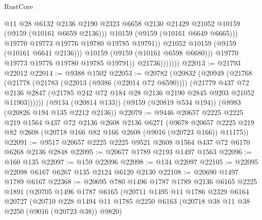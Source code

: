 \begin{lexlean}{RustCore}
\begin{coremodule}
                                  @11
                                  @28
                                  @6132
                                  @2136
                                  @2190
                                  @2323
                                  @6658
                                  @2130
                                  @21429
                                  @21052
                                  @10159
                                  (@9159 (@10161 @6659 @2136)))
                                @10159
                                (@9159 (@10161 @6649 @6665)))
                              @19770
                              @19773
                              @19776
                              @19780
                              @19785
                              @19791))
                          @21052
                          @10159
                          (@9159 (@10161 @6641 @2136)))
                        @10159
                        (@9159 (@10161 @6598 @6680)))
                      @19770
                      @19773
                      @19776
                      @19780
                      @19785
                      @19791))
                  @21736)))))))
@22013 := @21793 @22012
@22014 := @9388 @1502
@22053 := @20782
    (@20832
      (@20949
        (@21768
          (@21778
            (@21783 (@22013 (@9386 (@22014 @72 @6590))))
            (@21779
              @437
              @72
              @2136
              @2847
              (@21785 @242 @72 @184 @28 @2136 @2190 @2845 @9203 @21052 @11903))))))
    (@9134 (@20814 @133))
    (@9159 (@20819 @534 @194))
    (@8983 (@20826 @194 @135 @2212 @2136))
@22079 := @9446
    @20657
    @2225
    @2225
    @219
    @1564
    @437
    @72
    @2136
    @2608
    @2136
    @6271
    (@9678 @20657 @2225 @219 @82 @2608 (@20718 @166 @82 @166 @2608 (@9016 (@20723 @166)) @11175))
@22091 := @9517 @20657 @2225 @2225 @9521 @2608 @1564 @437 @72 @6170 @6268 @2136 @2848
@22095 := @20677 @1789 @2193 @1497 @1563
@22096 := @160 @135
@22097 := @159 @22096
@22098 := @134 @22097
@22105 := @22095 @22098 @6167 @6267 @135 @2124 @6120 @2130
@22108 := @20690 @1497 @1789 @6167
@22368 := @20695
    @780
    @1496
    @1787
    @1789
    @2136
    @6165
    @2225
    @1891
    (@20705
      @1496
      @1787
      @6165
      (@20711
        @1495
        @11
        @1786
        @2329
        @6164
        @20727
        (@20710
          @228
          @1494
          @11
          @1785
          @2250
          @6163
          (@20718 @38 @11 @38 @2250 (@9016 (@20723 @38)) @9820)

\end{coremodule}
\end{lexlean}
